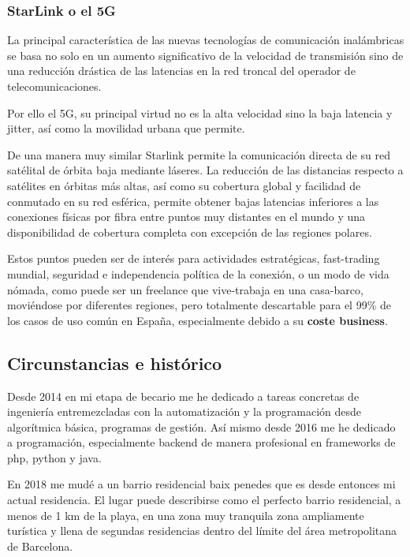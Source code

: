 \subsubsection{StarLink o el 5G}
La principal característica de las nuevas tecnologías de comunicación inalámbricas se basa no solo en un aumento significativo de la velocidad de transmisión sino de una reducción drástica de las latencias en la red troncal del operador de telecomunicaciones.

Por ello el 5G, su principal virtud no es la alta velocidad sino la baja latencia y jitter, así como la movilidad urbana que permite.

De una manera muy similar Starlink permite la comunicación directa de su red satélital de órbita baja mediante láseres. La reducción de las distancias respecto a satélites en órbitas más altas, así como su cobertura global y facilidad de conmutado en su red esférica, permite obtener bajas latencias inferiores a las conexiones físicas por fibra entre puntos muy distantes en el mundo y una disponibilidad de cobertura completa con excepción de las regiones polares.

Estos puntos pueden ser de interés para actividades estratégicas, fast-trading mundial, seguridad e independencia política de la conexión, o un modo de vida nómada, como puede ser un freelance que vive-trabaja en una casa-barco, moviéndose por diferentes regiones, pero totalmente descartable para el 99\% de los casos de uso común en España, especialmente debido a su \textbf{coste business}.

\subsection{Circunstancias e histórico}\label{S:circunstancias}
Desde 2014 en mi etapa de becario me he dedicado a tareas concretas de ingeniería entremezcladas con la automatización y la programación desde algorítmica básica, programas de gestión. Así mismo desde 2016  me he dedicado a programación, especialmente backend de manera profesional en frameworks de php, python y java.

En 2018 me mudé a un barrio residencial baix penedes que es desde entonces mi actual residencia. El lugar puede describirse como el perfecto barrio residencial, a menos de 1 km de la playa, en una zona muy tranquila zona ampliamente turística y llena de segundas residencias dentro del límite del área metropolitana de Barcelona.

